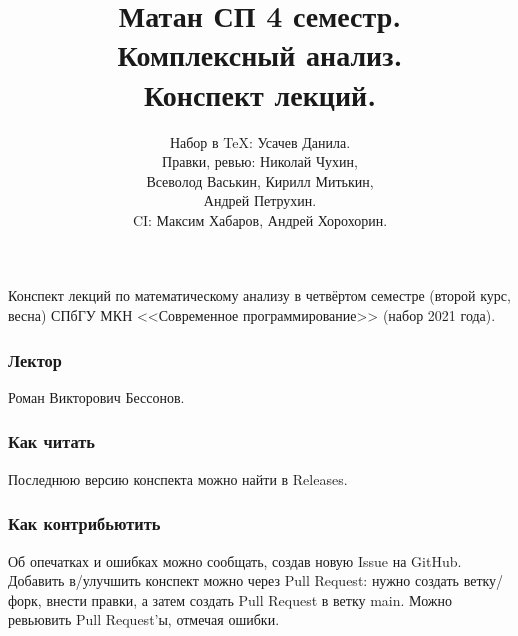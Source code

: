 \documentclass[a4paper,14pt]{extarticle}
\title{Матан СП 4 семестр. \\ Комплексный анализ. \\ Конспект лекций.}
\author{Набор в \TeX: Усачев Данила. \\ Правки, ревью: Николай Чухин, \\ Всеволод Васькин, Кирилл Митькин, \\ Андрей Петрухин. \\ CI: Максим Хабаров, Андрей Хорохорин.}
\theoremstyle{definition}
\theoremstyle{plain}
\theoremstyle{plain}
\theoremstyle{plain}
\theoremstyle{plain}
\theoremstyle{definition}
\theoremstyle{definition}
\theoremstyle{definition}
\theoremstyle{definition}
\theoremstyle{definition}
\theoremstyle{definition}
\theoremstyle{definition}
\theoremstyle{definition}
\theoremstyle{definition}
\theoremstyle{plain}
\theoremstyle{plain}
\theoremstyle{plain}
\theoremstyle{plain}
\theoremstyle{definition}
\theoremstyle{definition}
\theoremstyle{definition}
\theoremstyle{definition}
\theoremstyle{definition}
\theoremstyle{definition}
\begin{document}
\maketitle
Конспект лекций по математическому анализу в четвёртом семестре (второй курс, весна) СПбГУ МКН <<Современное программирование>> (набор 2021 года).
\subsubsection*{Лектор}
Роман Викторович Бессонов.
\subsubsection*{Как читать}
Последнюю версию конспекта можно найти в Releases.
\subsubsection*{Как контрибьютить}
Об опечатках и ошибках можно сообщать, создав новую Issue на GitHub.
Добавить в/улучшить конспект можно через Pull Request: нужно создать ветку/форк, внести правки, а затем создать Pull Request в ветку main.
Можно ревьювить Pull Request'ы, отмечая ошибки.
\newpage
\tableofcontents
\newpage









\end{document}
